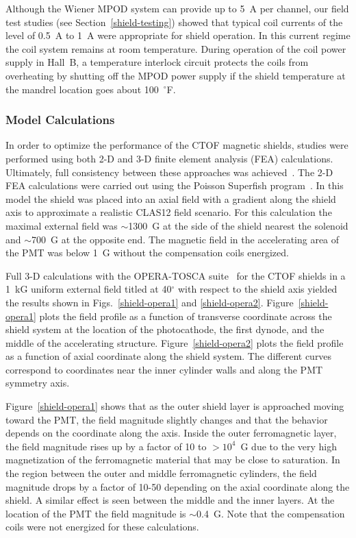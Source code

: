 \documentclass{elsart}
\begin{document}
Although the Wiener MPOD system can provide up to 5~A per channel, our field test studies
(see Section~\ref{shield-testing}) showed that typical coil currents of the level of 0.5~A
to 1~A were appropriate for shield operation. In this current regime the coil system remains
at room temperature. During operation of the coil power supply in Hall~B, a temperature
interlock circuit protects the coils from overheating by shutting off the MPOD power supply if
the shield temperature at the mandrel location goes about 100~$^{\circ}$F.

\subsubsection{Model Calculations}

In order to optimize the performance of the CTOF magnetic shields, studies were performed 
using both 2-D and 3-D finite element analysis (FEA) calculations. Ultimately, full 
consistency between these approaches was achieved~\cite{cn2015-003}. The 2-D FEA calculations 
were carried out using the Poisson Superfish program~\cite{poisson}. In this model the shield 
was placed into an axial field with a gradient along the shield axis to approximate a realistic 
CLAS12 field scenario. For this calculation the maximal external field was $\sim$1300~G at the 
side of the shield nearest the solenoid and $\sim$700~G at the opposite end. The magnetic field 
in the accelerating area of the PMT was below 1~G without the compensation coils energized. 

Full 3-D calculations with the OPERA-TOSCA suite~\cite{opera} for the CTOF shields in a 1~kG
uniform external field titled at 40$^\circ$ with respect to the shield axis yielded the results 
shown in Figs.~\ref{shield-opera1} and \ref{shield-opera2}. Figure~\ref{shield-opera1} plots the 
field profile as a function of transverse coordinate across the shield system at the location 
of the photocathode, the first dynode, and the middle of the accelerating structure. 
Figure~\ref{shield-opera2} plots the field profile as a function of axial coordinate along the 
shield system. The different curves correspond to coordinates near the inner cylinder 
walls and along the PMT symmetry axis.

Figure~\ref{shield-opera1} shows that as the outer shield layer is approached moving toward the
PMT, the field magnitude slightly changes and that the behavior depends on the coordinate along 
the axis. Inside the outer ferromagnetic layer, the field magnitude rises up by a factor of 
10 to $>10^4$~G due to the very high magnetization of the ferromagnetic material that may be 
close to saturation. In the region between the outer and middle ferromagnetic cylinders, the 
field magnitude drops by a factor of 10-50 depending on the axial coordinate along the shield. 
A similar effect is seen between the middle and the inner layers. At the location of the PMT 
the field magnitude is $\sim$0.4~G. Note that the compensation coils were not energized for 
these calculations. 
\end{document}

